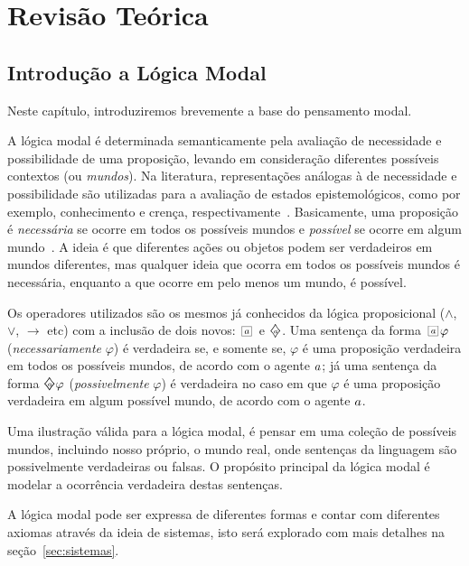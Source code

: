 \chapter{Revisão Teórica}
\label{cap:teo}

\section{Introdução a Lógica Modal}
\label{sec:l_gica_modal}
Neste capítulo, introduziremos brevemente a base do pensamento modal. 

A lógica modal é determinada semanticamente pela avaliação de necessidade e
possibilidade de uma proposição, levando em consideração diferentes possíveis
contextos (ou \emph{mundos}). Na literatura, representações análogas à de
necessidade e possibilidade são utilizadas para a avaliação de estados
epistemológicos, como por exemplo, conhecimento e crença,
respectivamente~\cite{belief}. Basicamente, uma proposição é \textit{necessária}
se ocorre em todos os possíveis mundos e \textit{possível} se ocorre em algum
mundo~\cite{chellas:modal_logic}.  A ideia é que
diferentes ações ou objetos podem ser verdadeiros em mundos diferentes, mas
qualquer ideia que ocorra em todos os possíveis mundos é necessária, enquanto a
que ocorre em pelo menos um mundo, é possível.

Os operadores utilizados são os mesmos já conhecidos da lógica proposicional
($\wedge$, $\vee$, $\rightarrow$ etc) com a inclusão de dois novos:
$\nec{\agent}$ e $\pos{\agent}$. Uma sentença da forma $\nec{\agent} \varphi$
(\textit{necessariamente} $\varphi$) é verdadeira se, e somente se, $\varphi$ é
uma proposição verdadeira em todos os possíveis mundos, de acordo com o agente
$a$; já uma sentença da forma $\pos{\agent} \varphi$
(\textit{possivelmente} $\varphi$) é verdadeira no caso em que $\varphi$ é uma
proposição verdadeira em algum possível mundo, de acordo com o agente $a$.

Uma ilustração válida para a lógica modal, é pensar em uma coleção de possíveis
mundos, incluindo nosso próprio, o mundo real, onde sentenças da linguagem são
possivelmente verdadeiras ou falsas. O propósito principal da lógica modal é
modelar a ocorrência verdadeira destas sentenças.

A lógica modal pode ser expressa de diferentes formas e contar com diferentes
axiomas através da ideia de sistemas, isto será explorado com mais detalhes 
na seção~\ref{sec:sistemas}. 


